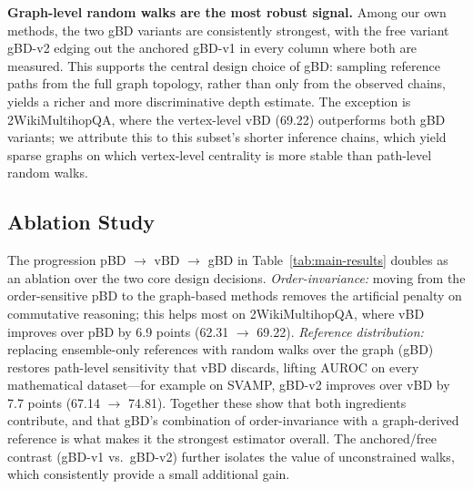 \documentclass[11pt]{article}
\begin{document}
\textbf{Graph-level random walks are the most robust signal.} Among our own
methods, the two gBD variants are consistently strongest, with the free variant
gBD-v2 edging out the anchored gBD-v1 in every column where both are measured.
This supports the central design choice of gBD: sampling reference paths from the
full graph topology, rather than only from the observed chains, yields a richer
and more discriminative depth estimate. The exception is 2WikiMultihopQA, where
the vertex-level vBD (69.22) outperforms both gBD variants; we attribute this to
this subset's shorter inference chains, which yield sparse graphs on which
vertex-level centrality is more stable than path-level random walks.

\subsection{Ablation Study}
\label{sec:exp:ablation}

The progression pBD $\rightarrow$ vBD $\rightarrow$ gBD in
Table~\ref{tab:main-results} doubles as an ablation over the two core design
decisions. \emph{Order-invariance:} moving from the order-sensitive pBD to the
graph-based methods removes the artificial penalty on commutative reasoning;
this helps most on 2WikiMultihopQA, where vBD improves over pBD by 6.9 points
(62.31 $\rightarrow$ 69.22). \emph{Reference distribution:} replacing
ensemble-only references with random walks over the graph (gBD) restores
path-level sensitivity that vBD discards, lifting AUROC on every mathematical
dataset---for example on SVAMP, gBD-v2 improves over vBD by 7.7 points
(67.14 $\rightarrow$ 74.81). Together these show that both ingredients
contribute, and that gBD's combination of order-invariance with a graph-derived
reference is what makes it the strongest estimator overall. The anchored/free
contrast (gBD-v1 vs.\ gBD-v2) further isolates the value of unconstrained walks,
which consistently provide a small additional gain.
\end{document}
